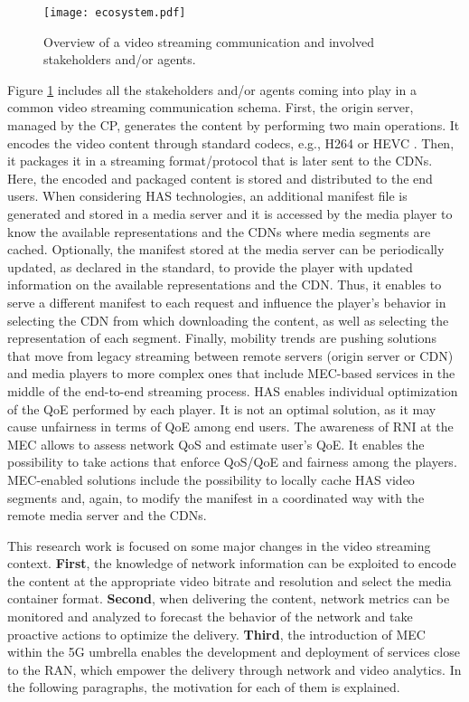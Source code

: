 \begin{figure}[htp]
	\centering
	\texttt{[image: ecosystem.pdf]}
	\caption{Overview of a video streaming communication and involved stakeholders and/or agents.}
	\label{fig:ecosystem}
\end{figure}

Figure \ref{fig:ecosystem} includes all the stakeholders and/or agents coming into play in a common video streaming communication schema.
First, the origin server, managed by the CP, generates the content by performing two main operations. It encodes the video content through standard codecs, e.g., H264 \cite{wiegand2003} or HEVC \cite{sullivan2012overview}. Then, it packages it in a streaming format/protocol that is later sent to the CDNs. Here, the encoded and packaged content is stored and distributed to the end users. When considering HAS technologies, an additional manifest file is generated and stored in a media server and it is accessed by the media player to know the available representations and the CDNs where media segments are cached. 
Optionally, the manifest stored at the media server can be periodically updated, as declared in the standard, to provide the player with updated information on the available representations and the CDN. Thus, it enables to serve a different manifest to each request and influence the player's behavior in selecting the CDN from which downloading the content, as well as selecting the representation of each segment.
Finally, mobility trends are pushing solutions that move from legacy streaming between remote servers (origin server or CDN) and media players to more complex ones that include MEC-based services in the middle of the end-to-end streaming process.
HAS enables individual optimization of the QoE performed by each player. It is not an optimal solution, as it may cause unfairness in terms of QoE among end users.
The awareness of RNI at the MEC allows to assess network QoS and estimate user's QoE. It enables the possibility to take actions that enforce QoS/QoE and fairness among the players.
MEC-enabled solutions include the possibility to locally cache HAS video segments and, again, to modify the manifest in a coordinated way with the remote media server and the CDNs.

This research work is focused on some major changes in the video streaming context.
\textbf{First}, the knowledge of network information can be exploited to encode the content at the appropriate video bitrate and resolution and select the media container format.
\textbf{Second}, when delivering the content, network metrics can be monitored and analyzed to forecast the behavior of the network and take proactive actions to optimize the delivery.
\textbf{Third}, the introduction of MEC within the 5G umbrella enables the development and deployment of services close to the RAN, which empower the delivery through network and video analytics.
In the following paragraphs, the motivation for each of them is explained.

